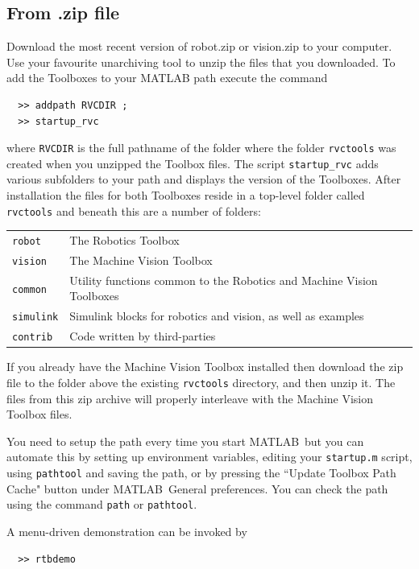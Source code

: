 \documentclass[a4paper,twoside]{report}
\def\Mlab{MATLAB}
\begin{document}
\subsection{From .zip file}
Download the most recent version of robot.zip or vision.zip to your computer. Use your favourite unarchiving tool to unzip the files that you downloaded.
To add the Toolboxes to your MATLAB path execute the command
\begin{verbatim}
  >> addpath RVCDIR ;
  >> startup_rvc
\end{verbatim}
where \texttt{RVCDIR} is the full pathname of the folder where the folder \texttt{rvctools} was created when you unzipped the Toolbox files. The script \texttt{startup\_rvc} adds various subfolders to your path and displays the version of the Toolboxes.
After installation the files for both Toolboxes reside in a top-level folder called \texttt{rvctools} and beneath this are a number of folders:

\begin{tabular}{ll}
\texttt{robot} & The Robotics Toolbox \\
\texttt{vision} & The Machine Vision Toolbox\\
\texttt{common} & Utility functions common to the Robotics and Machine Vision Toolboxes\\
\texttt{simulink}  & Simulink blocks for robotics and vision, as well as examples \\
\texttt{contrib} & Code written by third-parties\\
\end{tabular}

If you already have the Machine Vision Toolbox installed then download
the zip file to the folder above the existing \texttt{rvctools} directory,
and then unzip it.
The files from this zip archive will properly interleave with the Machine
Vision Toolbox files.

You need to setup the path every time you start \Mlab\ but you can 
automate this by setting up environment variables, editing your 
\texttt{startup.m} script, using \texttt{pathtool} and saving the path, or by pressing the ``Update Toolbox Path
Cache" button under \Mlab\ General preferences.
You can check the path using the command \texttt{path} or \texttt{pathtool}.

A menu-driven demonstration can be invoked by 
\begin{verbatim}
  >> rtbdemo
\end{verbatim}
\end{document}
